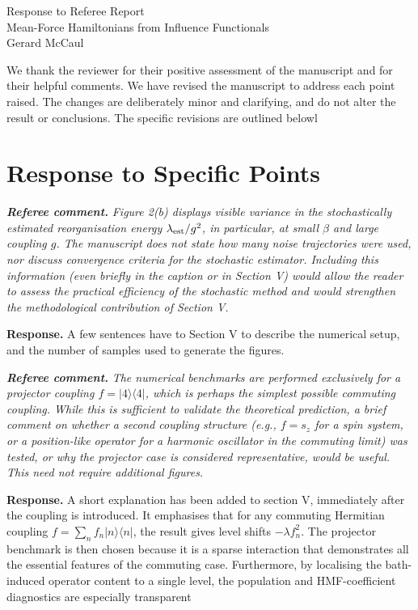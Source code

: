 \documentclass[11pt]{article}
\newcommand{\RC}[1]{\textbf{\textit{Referee comment.}} \textit{#1}}
\newcommand{\AR}[1]{\textbf{Response.} #1}
\begin{document}
\begin{center}
{\Large Response to Referee Report}\\[0.5em]
{\large Mean-Force Hamiltonians from Influence Functionals}\\[0.25em]
Gerard McCaul
\end{center}

We thank the reviewer for their positive assessment of the manuscript and for their helpful comments. We have revised the manuscript to address each point raised. The changes are deliberately minor and clarifying, and do not alter the result or conclusions. The specific revisions are outlined belowl

\section*{Response to Specific Points}

\RC{Figure 2(b) displays visible variance in the stochastically estimated reorganisation energy $\lambda_{\rm est}/g^2$, in particular, at small $\beta$ and large coupling $g$. The manuscript does not state how many noise trajectories were used, nor discuss convergence criteria for the stochastic estimator. Including this information (even briefly in the caption or in Section V) would allow the reader to assess the practical efficiency of the stochastic method and would strengthen the methodological contribution of Section V.}

\AR{A few sentences have to Section V to describe the numerical setup, and the number of samples used to generate the figures.}


\RC{The numerical benchmarks are performed exclusively for a projector coupling $f=|4\rangle\langle 4|$, which is perhaps the simplest possible commuting coupling. While this is sufficient to validate the theoretical prediction, a brief comment on whether a second coupling structure (e.g., $f=s_z$ for a spin system, or a position-like operator for a harmonic oscillator in the commuting limit) was tested, or why the projector case is considered representative, would be useful. This need not require additional figures.}

\AR{A short explanation has been added to section V, immediately after the coupling is introduced. It emphasises that for any commuting Hermitian coupling $f=\sum_n f_n |n\rangle\langle n|$, the result gives level shifts $-\lambda f_n^2$. The projector benchmark is then chosen because it is a sparse interaction that demonstrates all the essential features of the commuting case. Furthermore, by localising the bath-induced operator content to a single level, the population and HMF-coefficient diagnostics are especially transparent}
\end{document}
